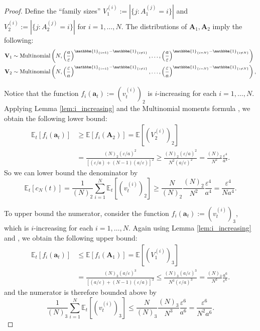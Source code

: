 \documentclass[fleqn]{article}
\theoremstyle{definition}
\newcommand{\E}{\mathbb{E}}
\newcommand{\1}[1]{\mathbbm{1}_{\{#1\}}}
\newcommand{\Mn}{\operatorname{Multinomial}}
\newcommand{\vt}[2][t]{v_{#1}^{(#2)}}
\begin{document}
\begin{proof}
Define the ``family sizes'' $V_1^{(i)} := |\{j: A_1^{(j)}=i\}|$ and $V_2^{(i)} := |\{j: A_2^{(j)}=i\}|$ for $i=1,\dots,N$. The distributions of $\mathbf{A}_1, \mathbf{A}_2$ imply the following:
\begin{align*}
& \mathbf{V}_1 \sim \Mn\left(N, \left( \frac{a}{\varepsilon} \right)^{\1{i=1} -\1{i\neq 1}} ,\dots, \left( \frac{a}{\varepsilon} \right)^{\1{i=N} -\1{i\neq N}} \right) \\
& \mathbf{V}_2 \sim \Mn\left(N, \left( \frac{\varepsilon}{a} \right)^{\1{i=1} -\1{i\neq 1}} ,\dots, \left( \frac{\varepsilon}{a} \right)^{\1{i=N} -\1{i\neq N}} \right),
\end{align*}

Notice that the function $f_i(\mathbf{a}_t) := (\vt{i})_2$ is $i$-increasing for each $i=1,\dots,N$. Applying Lemma \ref{lem:i_increasing} and the Multinomial moments formula \citep{mosimann1962}, we obtain the following lower bound:
\begin{align*}
\E_t[f_i(\mathbf{a}_t)] &\geq \E[f_i(\mathbf{A}_2)] = \E[(V_2^{(i)})_2] \\
&= \frac{(N)_2 (\varepsilon/a)^2}{[(\varepsilon/a) + (N-1)(a/\varepsilon)]^2}
\geq \frac{(N)_2 (\varepsilon/a)^2}{N^2(a/\varepsilon)^2}
= \frac{(N)_2}{N^2}\frac{\varepsilon^4}{a^4}.
\end{align*}
So we can lower bound the denominator by
\begin{equation*}
\E_t[c_N(t)] = \frac{1}{(N)_2} \sum_{i=1}^N \E_t[(\vt{i})_2]
\geq \frac{N}{(N)_2} \frac{(N)_2}{N^2}\frac{\varepsilon^4}{a^4}
= \frac{\varepsilon^4}{Na^4}.
\end{equation*}

To upper bound the numerator, consider the function $f_i(\mathbf{a}_t) := (\vt{i})_3$, which is $i$-increasing for each $i=1,\dots,N$.
Again using Lemma \ref{lem:i_increasing} and \citep{mosimann1962}, we obtain the following upper bound:
\begin{align*}
\E_t[f_i(\mathbf{a}_t)] &\leq \E[f_i(\mathbf{A}_1)] = \E[(V_1^{(i)})_3] \\
&= \frac{(N)_3 (a/\varepsilon)^3}{[(a/\varepsilon) + (N-1)(\varepsilon/a)]^3}
\leq \frac{(N)_3 (a/\varepsilon)^3}{N^3(\varepsilon/a)^3}
= \frac{(N)_3}{N^3}\frac{a^6}{\varepsilon^6}.
\end{align*}
and the numerator is therefore bounded above by
\begin{equation*}
\frac{1}{(N)_3} \sum_{i=1}^N \E_t[(\vt{i})_3]
\leq \frac{N}{(N)_3} \frac{(N)_3}{N^3}\frac{\varepsilon^6}{a^6}
= \frac{\varepsilon^6}{N^2a^6}.
\end{equation*}


\end{proof}
\end{document}
